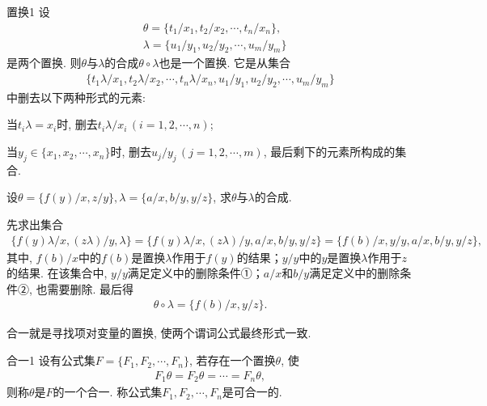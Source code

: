 \begin{mydef}{置换}{1}
设
\begin{align}
    &\theta =\{t_1/x_1,t_2/x_2,\cdots,t_n/x_n\},\\
    &\lambda =\{u_1/y_1, u_2/y_2, \cdots , u_m/y_m \}
\end{align}
是两个置换. 则$\theta$与$\lambda$的合成$\theta \circ \lambda$也是一个置换. 它是从集合
\begin{align}
  \{ t_1\lambda /x_1, t_2\lambda /x_2, \cdots , t_n\lambda /x_n,  u_1/y_1, u_2/y_2, \cdots , u_m/y_m \}
\end{align}
中删去以下两种形式的元素:

        当$t_i\lambda =x_i$时, 删去$t_i\lambda /x_i\, (i=1, 2 ,\cdots, n)$;

        当$y_j\in \{ x_1, x_2 ,\cdots, x_n\}时$, 删去$u_j/y_j\, (j=1, 2 ,\cdots, m)$, 最后剩下的元素所构成的集合.
\end{mydef}
\begin{example}
    设$\theta =\{ f(y)/x, z/y \}, \lambda =\{a/x, b/y ,y/z \}$, 求$\theta $与$\lambda $的合成.
\end{example}
\begin{result}
    先求出集合
\begin{align}
  \{f(y)\lambda/x, (z\lambda)/y, \lambda\}=\{f(y)\lambda/x, (z\lambda)/y,a/x, b/y , y/z\}=\{f(b)/x, y/y, a/x, b/y , y/z\},
\end{align}
其中, $f(b)/x$中的$f(b)$是置换$\lambda$作用于$f(y)$的结果；$y/y$中的$y$是置换$\lambda$作用于$z$的结果. 在该集合中, $y/y$满足定义中的删除条件①；$a/x$和$b/y$满足定义中的删除条件②, 也需要删除. 最后得
\begin{align}
  \theta \circ \lambda =\{f(b)/x, y/z\}.
\end{align}
\end{result}
\begin{remark}
    合一就是寻找项对变量的置换, 使两个谓词公式最终形式一致.
\end{remark}

\begin{mydef}{合一}{1}
设有公式集$F=\{F_1, F_2,\cdots,F_n\}$, 若存在一个置换$\theta$, 使
\begin{align}
  F_1\theta =F_2\theta =\cdots=F_n\theta ,
\end{align}
则称$\theta$是$F$的一个合一. 称公式集$F_1,F_2,\cdots,F_n$是可合一的.
\end{mydef}

